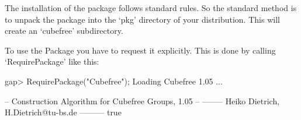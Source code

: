 

\null

The installation of the {\Cubefree} package follows standard {\GAP} rules.
So the standard method is to unpack the package into the `pkg'
directory  of your {\GAP} distribution.  This will create an `cubefree'
subdirectory. 

\null

To use the {\Cubefree} Package you have to request it explicitly. This  is
done by calling `RequirePackage' like this:

\beginexample
gap> RequirePackage("Cubefree");
Loading Cubefree 1.05 ...

   -- Construction Algorithm for Cubefree Groups, 1.05 --
   -------- Heiko Dietrich, H.Dietrich@tu-bs.de ---------
true
\endexample


